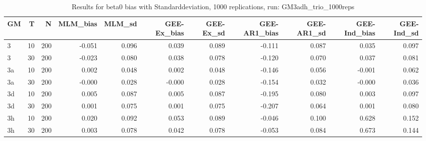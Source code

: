 \begin{table}[ht]
\centering
\begin{tabular}{lrrrrrrrrrr}
  \hline
GM & T & N & MLM\_bias & MLM\_sd & GEE-Ex\_bias & GEE-Ex\_sd & GEE-AR1\_bias & GEE-AR1\_sd & GEE-Ind\_bias & GEE-Ind\_sd \\ 
  \hline
3 & 10 & 200 & -0.051 & 0.096 & 0.039 & 0.089 & -0.111 & 0.087 & 0.035 & 0.097 \\ 
  3 & 30 & 200 & -0.023 & 0.080 & 0.038 & 0.078 & -0.120 & 0.070 & 0.037 & 0.081 \\ 
  3a & 10 & 200 & 0.002 & 0.048 & 0.002 & 0.048 & -0.146 & 0.056 & -0.001 & 0.062 \\ 
  3a & 30 & 200 & -0.000 & 0.028 & -0.000 & 0.028 & -0.154 & 0.032 & -0.000 & 0.036 \\ 
  3d & 10 & 200 & 0.005 & 0.087 & 0.005 & 0.087 & -0.195 & 0.080 & 0.003 & 0.097 \\ 
  3d & 30 & 200 & 0.001 & 0.075 & 0.001 & 0.075 & -0.207 & 0.064 & 0.001 & 0.080 \\ 
  3h & 10 & 200 & 0.020 & 0.092 & 0.053 & 0.089 & -0.046 & 0.100 & 0.628 & 0.152 \\ 
  3h & 30 & 200 & 0.003 & 0.078 & 0.042 & 0.078 & -0.053 & 0.084 & 0.673 & 0.144 \\ 
   \hline
\end{tabular}
\caption{Results for beta0 bias with Standarddeviation, 1000 replications, run: GM3adh_trio_1000reps} 
\label{tab:beta0_bias_sd}
\end{table}

